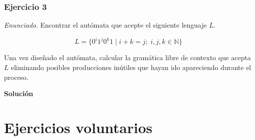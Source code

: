 \documentclass[11pt,a4paper]{article}
\newcommand{\enu}{\textit{Enunciado}}
\newcommand{\sol}{\textbf{Solución}}
\begin{document}
		\subsubsection{Ejercicio 3}
		\enu. Encontrar el autómata que acepte el siguiente lenguaje $L$.
		
		\[L = \lbrace 0^i 1^j 0^k 1 \; | \; i + k = j; \; i, j, k \in \mathbb{N} \rbrace\]
		
		Una vez diseñado el autómata, calcular la gramática libre de contexto que acepta $L$ eliminando posibles producciones
		inútiles que hayan ido apareciendo durante el proceso. \par
		
		\sol \par
		
	\newpage
	\section{Ejercicios voluntarios}
\end{document}
